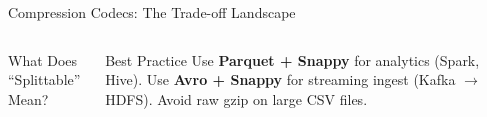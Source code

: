 \documentclass[aspectratio=169,10pt]{beamer}
\begin{document}
\begin{frame}{Compression Codecs: The Trade-off Landscape}
\begin{columns}[T]
\begin{exampleblock}{What Does ``Splittable'' Mean?}
      \end{exampleblock}
      \vspace{4pt}
      \begin{block}{Best Practice}
        \small Use \textbf{Parquet + Snappy} for analytics (Spark, Hive).  Use \textbf{Avro + Snappy} for streaming ingest (Kafka $\to$ HDFS).  Avoid raw gzip on large CSV files.
      \end{block}
  \end{columns}
\end{frame}
\end{document}
